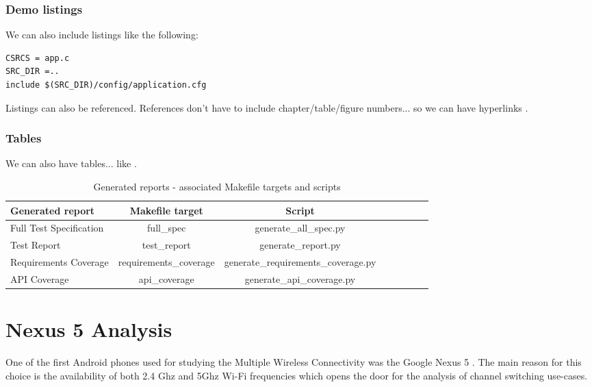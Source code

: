 \subsection{Demo listings}

We can also include listings like the following:

\lstset{language=make,caption=Application Makefile,label=lst:app-make}
\begin{lstlisting}
CSRCS = app.c
SRC_DIR =..
include $(SRC_DIR)/config/application.cfg
\end{lstlisting}

Listings can also be referenced. References don't have to include chapter/table/figure numbers... so we can have hyperlinks .

\subsection{Tables}

We can also have tables... like .

\begin{center}
\begin{table}[htb]
  \caption{Generated reports - associated Makefile targets and scripts}
  \begin{tabular}{l*{6}{c}r}
    Generated report & Makefile target & Script \\
    \hline
    Full Test Specification & full_spec & generate_all_spec.py  \\
    Test Report & test_report & generate_report.py  \\
    Requirements Coverage & requirements_coverage &
    generate_requirements_coverage.py   \\
    API Coverage & api_coverage & generate_api_coverage.py  \\
  \end{tabular}
  \label{table:reports}
\end{table}
\end{center}

\chapter{Nexus 5 Analysis}

One of the first Android phones used for studying the Multiple Wireless Connectivity was the Google Nexus 5 \cite{cite-nexus5}. The main reason for this choice is the availability of both 2.4 Ghz and 5Ghz Wi-Fi frequencies which opens the door for the analysis of channel switching use-cases. 

